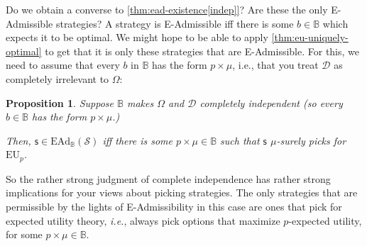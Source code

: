 \documentclass[a4paper]{article}
\newtheorem{proposition}[theorem]{Proposition}
\newcommand\EU{\mathrm{EU}}
\newcommand\EAd{\mathrm{EAd}}
\newcommand{\D}{\mathcal{D}}
\newcommand{\Decs}{\mathcal{D}}
\renewcommand\S{\mathcal{S}}
\newcommand\s{\mathsf{s}}
\newcommand{\IB}{\mathbb{B}}
\renewcommand{\color}[1]{}
\newcommand{\Strategies}{\S}
\newenvironment{CCM rewritten}
{\begingroup\color{blue}} %
{\endgroup}              %
\begin{document}
Do we obtain a converse to \cref{thm:ead-existence[indep]}?  Are these the only E-Admissible strategies? 
A strategy is E-Admissible iff there is some $b\in\IB$ which expects it to be optimal.
We might hope to be able to apply \cref{thm:eu-uniquely-optimal} to get that it is only these strategies that are E-Admissible. For this, we need to assume that every $b$ in $\IB$ has the form $p\times\mu$, i.e., that you treat $\D$ as completely irrelevant to $\Omega$:


\begin{proposition}\label{thm:ead-equiv[indep]} 	Suppose $\IB$ makes $\Omega$ and $\Decs$ completely independent (so every $b\in\IB$ has the form $p\times\mu$.)
	
	Then, $\s\in\EAd_\IB(\Strategies)$ iff there is some $p\times \mu\in\IB$ such that $\s$ $\mu$-surely picks for $\EU_p$. 
\end{proposition}

So the rather strong judgment of complete independence has rather strong implications for your views about picking strategies. The only strategies that are permissible by the lights of E-Admissibility in this case are ones that pick for expected utility theory, \emph{i.e.}, always pick options that maximize $p$-expected utility, for some $p\times \mu\in\IB$.



\begin{comment}
{\color{violet}
In fact, these are pretty much the only strategies that are permissible by the lights of E-Admissibility when coupled with $\IB$. Immediate from the definition of E-Admissibility, we have that a strategy is in $\EAd_\IB(\S)$ just if it is in $\EU_B(\S)$ for some $B\in\IB$. We can thus make use of \cref{thm:eu-self-rec,thm:eu-uniquely-optimal} to get the following, which applies when we have a strong independence. (In \cref{sect:EAd-dep} we will describe how this assumption can be dropped, but we first analyse it under this assumption.) 

\begin{proposition}\label{thm:ead-equiv[indep]}Suppose every $b\in\IB$ has the form $p\times\mu$.
	
	Then, $\s\in\EAd_\IB(\Strategies)$ iff $\s$ $\mu$-surely picks for $\EU_p$ for some $p\times \mu\in\IB$. 
\end{proposition}}
\end{comment}
\end{document}
